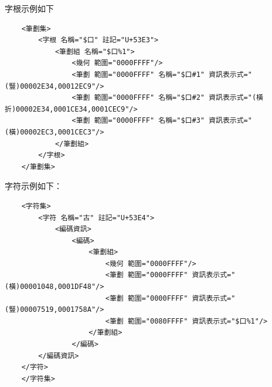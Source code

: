 字根示例如下
\listXML\begin{lstlisting}
	<筆劃集>
		<字根 名稱="$口" 註記="U+53E3">
			<筆劃組 名稱="$口%1">
				<幾何 範圍="0000FFFF"/>
				<筆劃 範圍="0000FFFF" 名稱="$口#1" 資訊表示式="(豎)00002E34,00012EC9"/>
				<筆劃 範圍="0000FFFF" 名稱="$口#2" 資訊表示式="(橫折)00002E34,0001CE34,0001CEC9"/>
				<筆劃 範圍="0000FFFF" 名稱="$口#3" 資訊表示式="(橫)00002EC3,0001CEC3"/>
			</筆劃組>
		</字根>
	</筆劃集>
\end{lstlisting}


字符示例如下：
\listXML\begin{lstlisting}
	<字符集>
		<字符 名稱="古" 註記="U+53E4">
			<編碼資訊>
				<編碼>
					<筆劃組>
						<幾何 範圍="0000FFFF"/>
						<筆劃 範圍="0000FFFF" 資訊表示式="(橫)00001048,0001DF48"/>
						<筆劃 範圍="0000FFFF" 資訊表示式="(豎)00007519,0001758A"/>
						<筆劃 範圍="0080FFFF" 資訊表示式="$口%1"/>
					</筆劃組>
				</編碼>
		</編碼資訊>
	</字符>
	</字符集>
\end{lstlisting}

